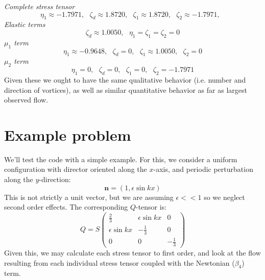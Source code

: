 \documentclass[reqno]{article}
\begin{document}
\noindent
\textit{Complete stress tensor}
\begin{equation}
  \eta_1 \approx -1.7971, \:\:\:
  \zeta_d \approx 1.8720, \:\:\:
  \zeta_1 \approx 1.8720, \:\:\:
  \zeta_2 \approx -1.7971, \:\:\:
\end{equation}
\textit{Elastic terms}
\begin{equation}
  \zeta_d \approx 1.0050, \:\:\:
  \eta_1 = \zeta_1 = \zeta_2 = 0
\end{equation}
\textit{$\mu_1$ term}
\begin{equation}
  \eta_1 \approx -0.9648, \:\:\:
  \zeta_d = 0, \:\:\:
  \zeta_1 \approx 1.0050, \:\:\:
  \zeta_2 = 0
\end{equation}
\textit{$\mu_2$ term}
\begin{equation}
  \eta_1 = 0, \:\:\:
  \zeta_d = 0, \:\:\:
  \zeta_1 = 0, \:\:\:
  \zeta_2 = -1.7971
\end{equation}
Given these we ought to have the same qualitative behavior (i.e. number and
direction of vortices), as well as similar quantitative behavior as far as
largest observed flow.

\section{Example problem}
We'll test the code with a simple example.
For this, we consider a uniform configuration with director oriented along the
$x$-axis, and periodic perturbation along the $y$-direction:
\begin{equation}
  \mathbf{n}
  =
  \left( 1, \epsilon \sin kx \right)
\end{equation}
This is not strictly a unit vector, but we are assuming $\epsilon << 1$ so we
neglect second order effects.
The corresponding $Q$-tensor is:
\begin{equation} \label{eq:periodic-Q}
  Q
  =
  S
  \begin{pmatrix}
    \frac23 & \epsilon \sin kx & 0 \\
    \epsilon \sin kx & -\frac13 & 0 \\
    0 & 0 & -\frac13
  \end{pmatrix}
\end{equation}
Given this, we may calculate each stress tensor to first order, and look at the
flow resulting from each individual stress tensor coupled with the Newtonian
($\beta_4$) term.
\end{document}
